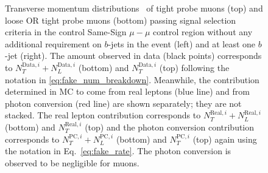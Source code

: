 \begin{figure}[ht]
{}
\caption{Transverse momentum distributions \pt\ of tight probe 
muons (top) and loose OR tight probe muons (bottom) passing signal 
selection criteria in the control Same-Sign $\mu-\mu$ control region 
without any additional requirement on $b$-jets in the event (left) and 
at least one $b$-jet (right). 
The amount observed in data (black points) corresponds 
to $N_T^{\textrm{Data},i}+N_L^{\textrm{Data},i}$ (bottom) and $N_T^{\textrm{Data},i}$ (top) following the notation
in \eqn\ref{eq:fake_num_breakdown}.
Meanwhile, the contribution determined in MC to come from 
real leptons (blue line) and from photon conversion (red line) are shown 
separately; they are not stacked. The real lepton contribution corresponds to 
$N_T^{\textrm{Real},i}+N_L^{\textrm{Real},i}$ (bottom) and $N_T^{\textrm{Real},i}$ 
(top) and the photon conversion 
contribution 
corresponds to $N_T^{\textrm{PC},i}+N_L^{\textrm{PC},i}$ (bottom) 
and $N_T^{\textrm{PC},i}$ (top) again using the notation 
in Eq.~\ref{eq:fake_rate}. 
The photon conversion is 
observed to be negligible for muons.  }
\label{fig:fakeEff_CRs_muon}
\end{figure}

